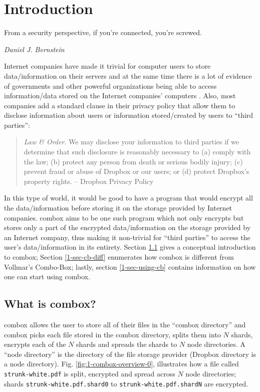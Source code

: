 \chapter{Introduction}

\epigraph{From a security perspective, if you're connected, you're
  screwed.}{\textit{Daniel J. Bernstein}}

Internet companies have made it trivial for computer users to store
data/information on their servers and at the same time there is a lot
of evidence of governments and other powerful organizations being able
to access information/data stored on the Internet companies' computers
\cite{website:wikileaks-spyfiles}. Also, most companies add a standard
clause in their privacy policy that allow them to disclose information
about users or information stored/created by users to ``third
parties'':

\begin{quote}
  \emph{Law \& Order}. We may disclose your information to third
  parties if we determine that such disclosure is reasonably necessary
  to (a) comply with the law; (b) protect any person from death or
  serious bodily injury; (c) prevent fraud or abuse of Dropbox or our
  users; or (d) protect Dropbox's property rights. -- Dropbox Privacy
  Policy \cite{website:dropbox-privacy}
\end{quote}

In this type of world, it would be good to have a program that would
encrypt all the data/information before storing it on the storage
provided by Internet companies. combox aims to be one such program
which not only encrypts but stores only a part of the encrypted
data/information on the storage provided by an Internet company, thus
making it non-trivial for ``third parties'' to access the user's
data/information in its entirety. Section \ref{1-sec-cb} gives a
conceptual introduction to combox; Section \ref{1-sec-cb-diff}
enumerates how combox is different from Vollmar's Combo-Box; lastly,
section \ref{1-sec-using-cb} contains information on how one can start
using combox.

\section{What is combox?}\label{1-sec-cb}

combox allows the user to store all of their files in the ``combox
directory'' and combox picks each file stored in the combox directory,
splits them into $N$ shards, encrypts each of the $N$ shards and
spreads the shards to $N$ node directories. A ``node directory'' is
the directory of the file storage provider (Dropbox directory is a
node directory). Fig. \ref{fig:1-combox-overview-0}, illustrates how a
file called \verb+strunk-white.pdf+ is split, encrypted and spread
across $N$ node directories; shards \verb+strunk-white.pdf.shard0+ to
\verb+strunk-white.pdf.shardN+ are encrypted.

